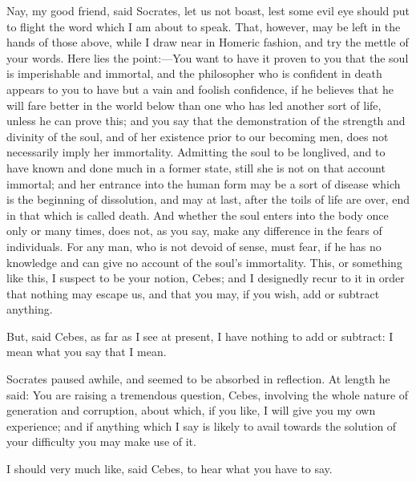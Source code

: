 Nay, my good friend, said Socrates, let us not boast, lest some evil eye
should put to flight the word which I am about to speak. That, however,
may be left in the hands of those above, while I draw near in Homeric
fashion, and try the mettle of your words. Here lies the point:—You
want to have it proven to you that the soul is imperishable and immortal,
and the philosopher who is confident in death appears to you to have but a
vain and foolish confidence, if he believes that he will fare better in
the world below than one who has led another sort of life, unless he can
prove this; and you say that the demonstration of the strength and
divinity of the soul, and of her existence prior to our becoming men, does
not necessarily imply her immortality. Admitting the soul to be longlived,
and to have known and done much in a former state, still she is not on
that account immortal; and her entrance into the human form may be a sort
of disease which is the beginning of dissolution, and may at last, after
the toils of life are over, end in that which is called death. And whether
the soul enters into the body once only or many times, does not, as you
say, make any difference in the fears of individuals. For any man, who is
not devoid of sense, must fear, if he has no knowledge and can give no
account of the soul's immortality. This, or something like this, I suspect
to be your notion, Cebes; and I designedly recur to it in order that
nothing may escape us, and that you may, if you wish, add or subtract
anything.

But, said Cebes, as far as I see at present, I have nothing to add or
subtract: I mean what you say that I mean.

Socrates paused awhile, and seemed to be absorbed in reflection. At length
he said: You are raising a tremendous question, Cebes, involving the whole
nature of generation and corruption, about which, if you like, I will give
you my own experience; and if anything which I say is likely to avail
towards the solution of your difficulty you may make use of it.

I should very much like, said Cebes, to hear what you have to say.

